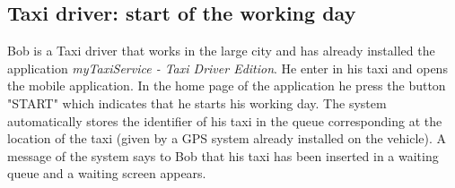 \subsection{Taxi driver: start of the working day}
Bob is a Taxi driver that works in the large city and has already installed the application \textit{myTaxiService - Taxi Driver Edition}.
He enter in his taxi and opens the mobile application. In the home page of the application he press the button "START" which indicates that he starts his working day. The system automatically stores the identifier of his taxi in the queue corresponding at the location of the taxi (given by a GPS system already installed on the vehicle).
A message of the system says to Bob that his taxi has been inserted in a waiting queue and a waiting screen appears.